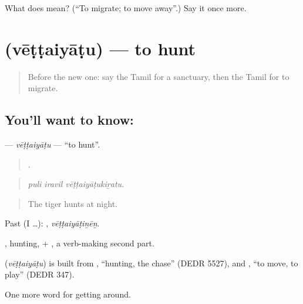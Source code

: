 \begin{tcolorbox}[breakable,colback=teal!4,colframe=teal!35!black,title={Before you move on}]
What does  mean? (\textquotedblleft{}To migrate; to move away\textquotedblright{}.) Say it once more.
\end{tcolorbox}
\section[\texorpdfstring{\ta{வேட்டையாடு} (vēṭṭaiyāṭu)}{வேட்டையாடு (vēṭṭaiyāṭu)}]{ (vēṭṭaiyāṭu) — to hunt}

\label{lesson:TA-C437-vettaiyatu}



\begin{quote}
Before the new one: say the Tamil for a sanctuary, then the Tamil for to migrate.
\end{quote}

\subsection*{You'll want to know: }
\textbf{} — \emph{vēṭṭaiyāṭu} — \textquotedblleft{}to hunt\textquotedblright{}.

\begin{quote}
  .
\end{quote}

\begin{quote}
\emph{puli iravil vēṭṭaiyāṭukiṟatu.}
\end{quote}

\begin{quote}
The tiger hunts at night.
\end{quote}

Past (I …): , \emph{vēṭṭaiyāṭiṉēṉ}.

, hunting, + , a verb-making second part.

\begin{cousinweb}
\textbf{} (\emph{vēṭṭaiyāṭu}) is built from , \textquotedblleft{}hunting, the chase\textquotedblright{} (DEDR 5527), and , \textquotedblleft{}to move, to play\textquotedblright{} (DEDR 347).
\end{cousinweb}

\begin{grammarlens}[title={What you've built}]
One more word for getting around.
\end{grammarlens}

